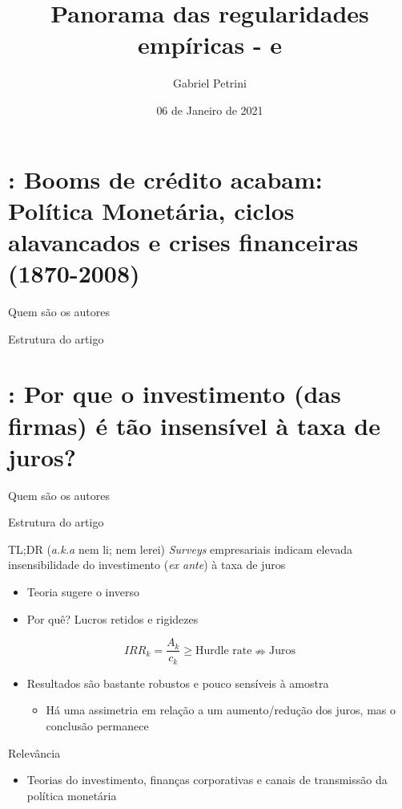 \documentclass[presentation]{beamer}
\author{Gabriel Petrini}
\date{06 de Janeiro de 2021}
\title{Panorama das regularidades empíricas - \textcite{schularickCreditBoomsGone2012} e  \textcite{sharpe_2020_Why}}
\begin{document}
\maketitle
\section{\textcite{schularickCreditBoomsGone2012}: Booms de crédito acabam: Política Monetária, ciclos alavancados e crises financeiras (1870-2008)}
\label{sec:orgf9efa51}

\begin{frame}[label={sec:orgc665d69}]{Quem são os autores}
\end{frame}

\begin{frame}[label={sec:org68222f2}]{Estrutura do artigo}
\end{frame}

\section{\textcite{sharpe_2020_Why}: Por que o investimento (das firmas) é tão insensível à taxa de juros?}
\label{sec:orgb5797fa}

\begin{frame}[label={sec:org973f2db}]{Quem são os autores}
\end{frame}

\begin{frame}[label={sec:org5c492d2}]{Estrutura do artigo}
\end{frame}
\begin{frame}[label={sec:org9b4b8f2}]{TL;DR (\emph{a.k.a} nem li; nem lerei)}
\emph{Surveys} empresariais indicam elevada insensibilidade do investimento (\emph{ex ante}) à taxa de juros
\begin{itemize}
\item Teoria sugere o inverso
\item Por quê? Lucros retidos e rigidezes
\end{itemize}

$$
IRR_{k} = \frac{A_{k}}{c_{k}} \geq \text{Hurdle rate} \nRightarrow \text{Juros}
$$

\begin{itemize}
\item Resultados são bastante robustos e pouco sensíveis à amostra
\begin{itemize}
\item Há uma assimetria em relação a um aumento/redução dos juros, mas o conclusão permanece
\end{itemize}
\end{itemize}

\begin{block}{Relevância}
\begin{itemize}
\item Teorias do investimento, finanças corporativas e canais de transmissão da política monetária
\end{itemize}
\end{block}
\end{frame}
\end{document}
